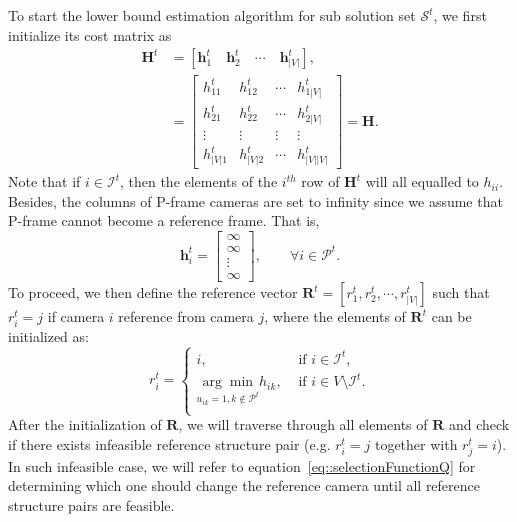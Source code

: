 To start the lower bound estimation algorithm for sub solution set $\mathcal{S}^t$, we first initialize its cost matrix as
\begin{align}
\mathbf{H}^t
&= \left[ \mathbf{h}_1^t \quad \mathbf{h}_2^t \quad \cdots \quad \mathbf{h}_{|V|}^t \right], \nonumber \\
&= \left[ \begin{array}{cccc}
h_{11}^t &h_{12}^t &\cdots &h_{1|V|}^t \\
h_{21}^t &h_{22}^t &\cdots &h_{2|V|}^t \\
\vdots &\vdots &\vdots &\vdots \\
h_{|V|1}^t &h_{|V|2}^t &\cdots &h_{|V||V|}^t
\end{array} \right]
= \mathbf{H}.
\label{eq::modBBcostMatrix}
\end{align}
Note that if $i \in \mathcal{I}^t$, then the elements of the $i^{th}$ row of $\mathbf{H}^t$ will all equalled to $h_{ii}$.
Besides, the columns of P-frame cameras are set to infinity since we assume that P-frame cannot become a reference frame.
That is,
\begin{equation}
\mathbf{h}^t_i = \left[ \begin{array}{c}
\infty \\
\infty \\
\vdots \\
\infty
\end{array} \right],
\quad \quad \forall i \in \mathcal{P}^t.
\label{eq::infColumn}
\end{equation}
To proceed, we then define the reference vector ${\mathbf{R}^t = [r_1^t,r_2^t,\cdots,r_{|V|}^t]}$ such that $r_i^t = j$ if camera $i$ reference from camera $j$, where the elements of $\mathbf{R}^t$ can be initialized as:
\begin{equation}
r_i^t = 
\left\{ \begin{array}{cc}
i,  &\text{ if $i \in \mathcal{I}^t$,} \\                  	   
\underset{u_{ik}=1, k \notin \mathcal{P}^t}{\arg\min} h_{ik},  &\text{ if $i \in V\setminus \mathcal{I}^t$.} \\
\end{array} \right.
\label{eq::initRefStructure}
\end{equation}
After the initialization of $\mathbf{R}$, we will traverse through all elements of $\mathbf{R}$ and check if there exists infeasible reference structure pair (e.g. $r_i^t = j$ together with $r_j^t=i$).
In such infeasible case, we will refer to equation~\eqref{eq::selectionFunctionQ} for determining which one should change the reference camera until all reference structure pairs are feasible.
